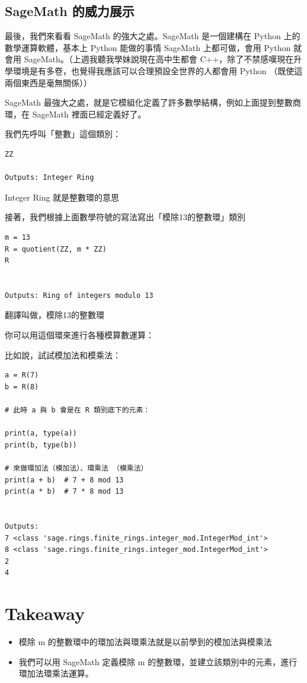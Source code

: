 \documentclass[
]{article}
\providecommand{\tightlist}{%
  \setlength{\itemsep}{0pt}\setlength{\parskip}{0pt}}
\begin{document}
\hypertarget{sagemath-ux7684ux5a01ux529bux5c55ux793a}{%
\subsection{SageMath
的威力展示}\label{sagemath-ux7684ux5a01ux529bux5c55ux793a}}

最後，我們來看看 SageMath 的強大之處。SageMath 是一個建構在 Python
上的數學運算軟體，基本上 Python 能做的事情 SageMath 上都可做，會用
Python 就會用 SageMath。（上週我聽我學妹說現在高中生都會
C++，除了不禁感嘆現在升學環境是有多卷，也覺得我應該可以合理預設全世界的人都會用
Python （既使這兩個東西是毫無關係））

SageMath
最強大之處，就是它模組化定義了許多數學結構，例如上面提到整數商環，在
SageMath 裡面已經定義好了。

我們先呼叫「整數」這個類別：

\begin{verbatim}
ZZ

Outputs: Integer Ring
\end{verbatim}

Integer Ring 就是整數環的意思

接著，我們根據上面數學符號的寫法寫出「模除13的整數環」類別

\begin{verbatim}
m = 13
R = quotient(ZZ, m * ZZ)
R


Outputs: Ring of integers modulo 13
\end{verbatim}

翻譯叫做，模除13的整數環

你可以用這個環來進行各種模算數運算：

比如說，試試模加法和模乘法：

\begin{verbatim}
a = R(7)
b = R(8)

# 此時 a 與 b 會是在 R 類別底下的元素：

print(a, type(a))
print(b, type(b))

# 來做環加法（模加法）、環乘法 （模乘法）
print(a + b)  # 7 + 8 mod 13
print(a * b)  # 7 * 8 mod 13


Outputs:
7 <class 'sage.rings.finite_rings.integer_mod.IntegerMod_int'>
8 <class 'sage.rings.finite_rings.integer_mod.IntegerMod_int'>
2
4
\end{verbatim}

\hypertarget{takeaway}{%
\section{Takeaway}\label{takeaway}}

\begin{itemize}
\tightlist
\item
  模除 m 的整數環中的環加法與環乘法就是以前學到的模加法與模乘法
\item
  我們可以用 SageMath 定義模除 m
  的整數環，並建立該類別中的元素，進行環加法環乘法運算。
\end{itemize}
\end{document}
